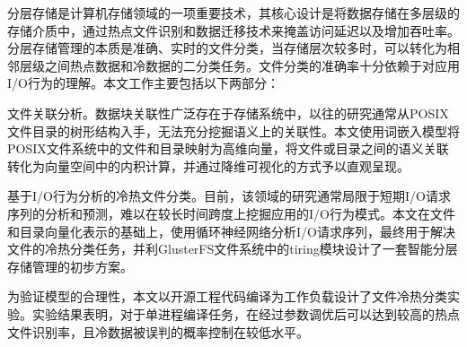 \begin{cabstract}
分层存储是计算机存储领域的一项重要技术，其核心设计是将数据存储在多层级的存储介质中，通过热点文件识别和数据迁移技术来掩盖访问延迟以及增加吞吐率。分层存储管理的本质是准确、实时的文件分类，当存储层次较多时，可以转化为相邻层级之间热点数据和冷数据的二分类任务。文件分类的准确率十分依赖于对应用I/O行为的理解。本文工作主要包括以下两部分：

文件关联分析。数据块关联性广泛存在于存储系统中，以往的研究通常从POSIX文件目录的树形结构入手，无法充分挖掘语义上的关联性。本文使用词嵌入模型将POSIX文件系统中的文件和目录映射为高维向量，将文件或目录之间的语义关联转化为向量空间中的内积计算，并通过降维可视化的方式予以直观呈现。

基于I/O行为分析的冷热文件分类。目前，该领域的研究通常局限于短期I/O请求序列的分析和预测，难以在较长时间跨度上挖掘应用的I/O行为模式。本文在文件和目录向量化表示的基础上，使用循环神经网络分析I/O请求序列，最终用于解决文件的冷热分类任务，并利GlusterFS文件系统中的tiring模块设计了一套智能分层存储管理的初步方案。

为验证模型的合理性，本文以开源工程代码编译为工作负载设计了文件冷热分类实验。实验结果表明，对于单进程编译任务，在经过参数调优后可以达到较高的热点文件识别率，且冷数据被误判的概率控制在较低水平。

\end{cabstract}

